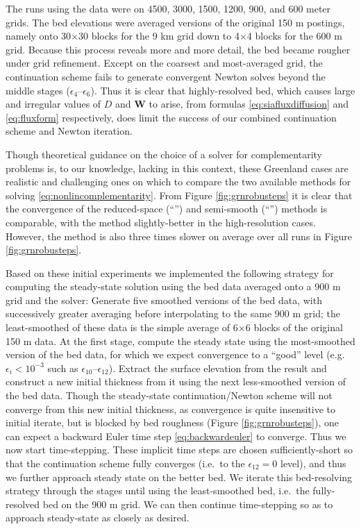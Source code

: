 \documentclass[review,letterpaper]{igs}
\newcommand\bW{\mathbf{W}}
\newcommand\eps{\epsilon}
\begin{document}
The runs using the \MCB data were on 4500, 3000, 1500, 1200, 900, and 600 meter grids.  The bed elevations were averaged versions of the original 150 m postings, namely onto 30$\times$30 blocks for the 9 km grid down to 4$\times$4 blocks for the 600 m grid.  Because this process reveals more and more detail, the bed became rougher under grid refinement.  Except on the coarsest and most-averaged grid, the continuation scheme fails to generate convergent Newton solves beyond the middle stages ($\eps_4$--$\eps_6$).  Thus it is clear that highly-resolved bed, which causes large and irregular values of $D$ and $\bW$ to arise, from formulas \eqref{eq:siafluxdiffusion} and \eqref{eq:fluxform} respectively, does limit the success of our combined continuation scheme and Newton iteration.

Though theoretical guidance on the choice of a solver for complementarity problems is, to our knowledge, lacking in this context, these Greenland cases are realistic and challenging ones on which to compare the two available methods for solving \eqref{eq:nonlincomplementarity}.  From Figure \ref{fig:grnrobusteps} it is clear that the convergence of the reduced-space (``\virs'') and semi-smooth (``\viss'') methods \citep{BensonMunson2006} is comparable, with the \virs method slightly-better in the high-resolution cases.  However, the \viss method is also three times slower on average over all runs in Figure \ref{fig:grnrobusteps}.

Based on these initial experiments we implemented the following strategy for computing the steady-state solution using the \MCB bed data averaged onto a 900 m grid and the \virs solver:  Generate five smoothed versions of the bed data, with successively greater averaging before interpolating to the same 900 m grid; the least-smoothed of these data is the simple average of 6$\times$6 blocks of the original 150 m data.  At the first stage, compute the steady state using the most-smoothed version of the bed data, for which we expect convergence to a ``good'' level (e.g.~$\eps_i<10^{-3}$ such as $\eps_{10}$--$\eps_{12}$).  Extract the surface elevation from the result and construct a new initial thickness from it using the next less-smoothed version of the bed data.  Though the steady-state continuation/Newton scheme will not converge from this new initial thickness, as convergence is quite insensitive to initial iterate, but is blocked by bed roughness (Figure \ref{fig:grnrobusteps}), one can expect a backward Euler time step \eqref{eq:backwardeuler} to converge.  Thus we now start time-stepping.  These implicit time steps are chosen sufficiently-short so that the continuation scheme fully converges (i.e.~to the $\eps_{12}=0$ level), and thus we further approach steady state on the better bed.  We iterate this bed-resolving strategy through the stages until using the least-smoothed bed, i.e.~the fully-resolved bed on the 900 m grid.  We can then continue time-stepping so as to approach steady-state as closely as desired.
\end{document}
